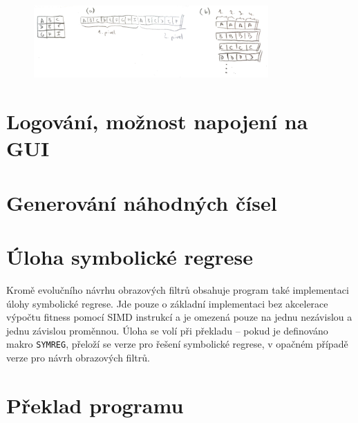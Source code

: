 
\begin{figure}[hb]
    \centering
    \includegraphics[width=0.8\textwidth]{fig/windows}
    \caption{}
    \label{obrDevitiokoli}
\end{figure}


\section{Logování, možnost napojení na GUI}
\label{secImplExperimental}



\section{Generování náhodných čísel}

\section{Úloha symbolické regrese}

Kromě evolučního návrhu obrazových filtrů obsahuje program také implementaci úlohy symbolické regrese. Jde pouze o základní implementaci bez akcelerace výpočtu fitness pomocí SIMD instrukcí a je omezená pouze na jednu nezávislou a jednu závislou proměnnou. Úloha se volí při překladu -- pokud je definováno makro \texttt{SYMREG}, přeloží se verze pro řešení symbolické regrese, v opačném případě verze pro návrh obrazových filtrů.

\section{}

\section{Překlad programu}

